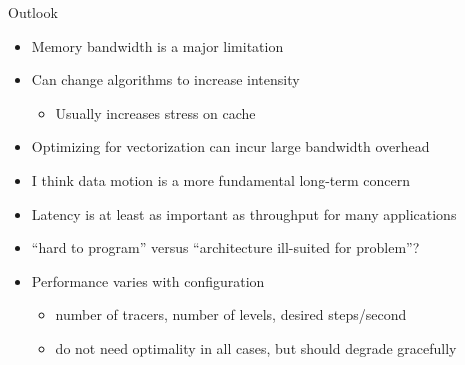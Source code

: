 \documentclass{beamer}
\begin{document}
\begin{frame}{Outlook}
  \begin{itemize}
  \item Memory bandwidth is a major limitation
  \item Can change algorithms to increase intensity
    \begin{itemize}
    \item Usually increases stress on cache
    \end{itemize}
  \item Optimizing for vectorization can incur large bandwidth overhead
  \item I think data motion is a more fundamental long-term concern
  \item Latency is at least as important as throughput for many applications
  \item ``hard to program'' versus ``architecture ill-suited for problem''?
  \item Performance varies with configuration
    \begin{itemize}
    \item number of tracers, number of levels, desired steps/second
    \item do not need optimality in all cases, but should degrade gracefully
    \end{itemize}
  \end{itemize}
\end{frame}
\end{document}
